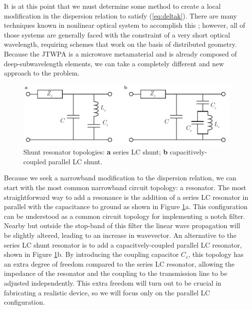 It is at this point that we must determine some method to create a local modification in the dispersion relation to satisfy (\ref{eq:deltak}).  There are many techniques known in nonlinear optical system to accomplish this \cite{armstrong_interactions_1962,Agrawal2012}; however, all of those systems are generally faced with the constraint of a very short optical wavelength, requiring schemes that work on the basis of distributed geometry.  Because the JTWPA is a microwave metamaterial and is already composed of deep-subwavelength elements, we can take a completely different and new approach to the problem.

\begin{figure}
\begin{center}
\includegraphics[width=6in]{twpa_theory/shunt_resonators}
\end{center}
\caption[Shunt resonator topologies]{Shunt resonator topologies: \textbf{a} series LC shunt; \textbf{b} capacitively-coupled parallel LC shunt.}
\label{fig:shuntres}
\end{figure}

Because we seek a narrowband modification to the dispersion relation, we can start with the most common narrowband circuit topology: a resonator.  The most straightforward way to add a resonance is the addition of a series LC resonator in parallel with the capacitance to ground as shown in Figure \ref{fig:shuntres}a.  This configuration can be understood as a common circuit topology for implementing a notch filter.  Nearby but outside the stop-band of this filter the linear wave propagation will be slightly altered, leading to an increase in wavevector.  An alternative to the series LC shunt resonator is to add a capacitvely-coupled parallel LC resonator, shown in Figure \ref{fig:shuntres}b.  By introducing the coupling capacitor $C_c$, this topology has an extra degree of freedom compared to the series LC resonator, allowing the impedance of the resonator and the coupling to the transmission line to be adjusted independently.  This extra freedom will turn out to be crucial in fabricating a realistic device, so we will focus only on the parallel LC configuration.

